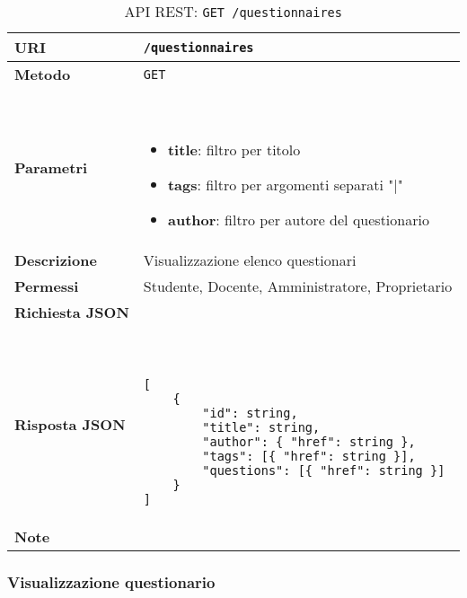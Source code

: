         \begin{table}[H]
            \begin{center}
                \begin{tabular}{p{} p{}}
                    \toprule
                    \textbf{URI} & \texttt{/questionnaires} \\ \midrule
                    \textbf{Metodo} & \texttt{GET} \\ \midrule
                    \textbf{Parametri} & \
                        \begin{itemize}
                            \item \textbf{title}: filtro per titolo
                            \item \textbf{tags}: filtro per argomenti separati "|" 
                            \item \textbf{author}: filtro per autore del questionario
                        \end{itemize}
                        \\ \midrule
                    \textbf{Descrizione} & Visualizzazione elenco questionari \\ \midrule
                    \textbf{Permessi} & Studente, Docente, Amministratore, Proprietario  \\ \midrule
                    \textbf{Richiesta JSON} & \\ \midrule
                    \textbf{Risposta JSON} & \
                        \begin{lstlisting}[basicstyle={\ttfamily}]
[
    {
        "id": string,
        "title": string,
        "author": { "href": string },
        "tags": [{ "href": string }],
        "questions": [{ "href": string }] 
    }
]
                        \end{lstlisting}
                        \\ \midrule
                    \textbf{Note} & \\
                    \bottomrule
                \end{tabular}
                \caption{API REST: \texttt{GET /questionnaires}}
            \end{center}
        \end{table}

    \subsubsection{Visualizzazione questionario}

